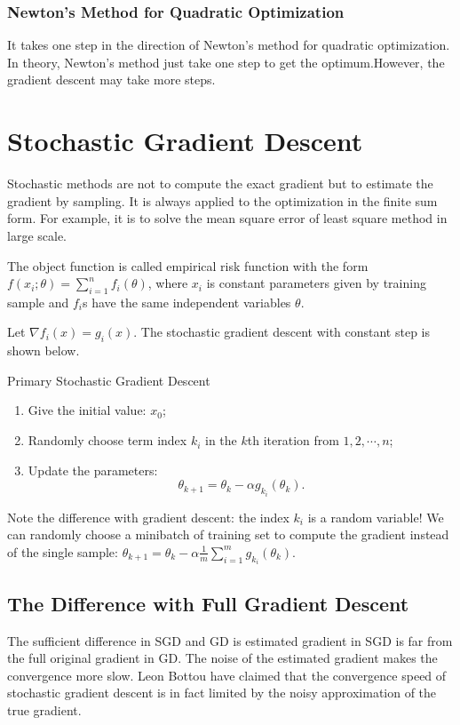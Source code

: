 \documentclass[11pt]{article} %
\begin{document}
\subsubsection{Newton's Method for Quadratic Optimization}
It takes one step in the direction of Newton's method for quadratic optimization.
In theory, Newton's method just take one step to get the optimum.However, the gradient descent may take more steps.

\section{Stochastic Gradient Descent}

Stochastic methods are not to compute the exact gradient but to estimate the gradient by sampling.
It is always applied to the optimization in the finite sum form. For example, it is to solve the mean square error of least square method in large scale.

The object function is called empirical risk function with the
form $f(x_i;\theta)=\sum_{i=1}^{n}f_{i}(\theta)$, where $x_i$ is constant parameters given by training sample and $f_{i}$s have the same independent variables $\theta$.

Let $\nabla f_{i}(x) = g_{i}(x)$. The stochastic gradient descent with constant step is shown below.
\begin{algorithm}[htb]
\caption{Primary Stochastic Gradient Descent}
\label{SGD}
\begin{enumerate}
  \item Give the initial value: $x_0$;
  \item Randomly choose term index $k_{i}$ in the $k$th iteration from ${1,2,\cdots, n}$;
  \item Update the parameters: $${\theta}_{k+1}={\theta}_{k} - \alpha g_{k_{i}}({\theta}_{k}).$$
\end{enumerate}
\end{algorithm}

Note the difference with gradient descent: the index $k_{i}$ is a random variable!
We can randomly choose a minibatch of training set to compute the gradient instead of the single sample:
${\theta}_{k+1}={\theta}_{k} - \alpha \frac{1}{m}\sum_{i=1}^{m}g_{k_{i}}({\theta}_{k})$.


\subsection{The Difference with Full Gradient Descent}
The sufficient difference in SGD and GD is estimated gradient in SGD is far from the full original gradient in GD.
The noise of the estimated gradient makes the convergence more slow.
Leon Bottou have claimed that the  convergence speed of stochastic gradient descent is in fact limited by the noisy approximation of the true gradient.
\end{document}
